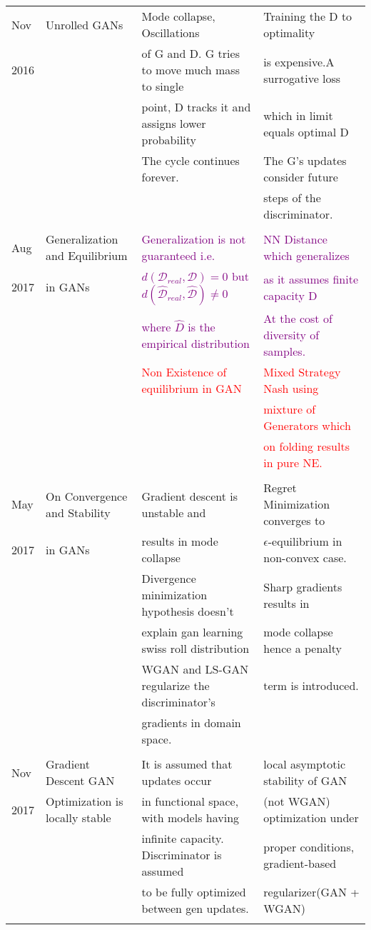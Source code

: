 \begin{adjustbox}{max width = 9cm}
\begin{tabular}{|l|l|l|l|}
Nov&Unrolled GANs \cite{unrolled} & Mode collapse, Oscillations& Training the D to optimality\\
2016&&of G and D. G tries to move much mass to single & is expensive.A surrogative loss \\
&&point, D tracks it and assigns lower probability& which in limit equals optimal D \\
&&The cycle continues forever.& The G's updates consider future\\
&&&steps of the discriminator.\\
&&&\\
Aug& Generalization and Equilibrium &\textcolor{purple}{Generalization is not guaranteed i.e.} &\textcolor{purple}{NN Distance which generalizes} \\
2017 &in GANs \cite{Arora03}&\textcolor{purple}{$d(\mathcal{D}_{real}, \mathcal{D}) = 0$ but  $d(\mathcal{\hat{D}}_{real}, \mathcal{\hat{D}}) \neq 0$}&\textcolor{purple}{as it assumes finite capacity D} \\
&& \textcolor{purple}{where $\hat{D}$ is the empirical distribution} & \textcolor{purple}{At the cost of diversity of samples.}\\
&&\textcolor{red}{Non Existence of equilibrium in GAN} &\textcolor{red}{Mixed Strategy Nash using}  \\
&&&\textcolor{red}{mixture of Generators which} \\
&&& \textcolor{red}{on folding results in pure NE.}\\
&&&\\
May & On Convergence and Stability& Gradient descent is unstable and & Regret Minimization converges to  \\
 2017 & in GANs \cite{DRAGAN} &results in mode collapse &$\epsilon$-equilibrium in non-convex case.  \\
& &Divergence minimization hypothesis doesn't  & Sharp gradients results in  \\ 
&& explain gan learning swiss roll distribution & mode collapse hence a penalty\\
&&WGAN and LS-GAN regularize the discriminator's& term is introduced.\\
&&gradients in domain space.&\\
&&&\\
Nov & Gradient Descent GAN & It is assumed that updates occur  & local asymptotic stability of GAN  \\
 2017 &  Optimization is locally stable & in functional space, with models having & 
(not WGAN)  optimization under   \\
&  &infinite capacity. Discriminator is assumed  & 
proper conditions, gradient-based  \\
&  &to be fully optimized between gen updates.  & 
 regularizer(GAN + WGAN)  \\
&&&\\
\hline 
\end{tabular}
\end{adjustbox}